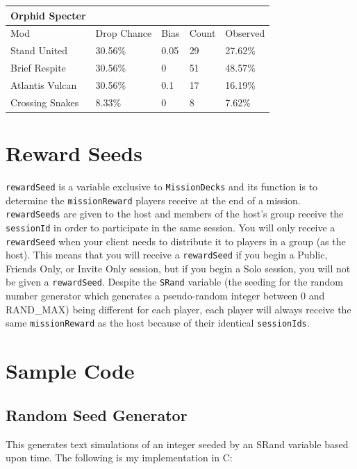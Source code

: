 \documentclass[12pt]{article}
\begin{document}
\begin{center}
	\begin{tabular}{|l||l|l|l||l|}
		\hline
		Orphid Specter \\
		\hline
		Mod             & Drop Chance & Bias & Count & Observed \\
		\hline
		Stand United    & 30.56\%     & 0.05 & 29    & 27.62\%  \\
		Brief Respite   & 30.56\%     & 0    & 51    & 48.57\%  \\
		Atlantis Vulcan & 30.56\%     & 0.1  & 17    & 16.19\%  \\
		Crossing Snakes & 8.33\%      & 0    & 8     & 7.62\%   \\ 
		\hline
	\end{tabular}
\end{center}

\section{Reward Seeds}

\texttt{rewardSeed} is a variable exclusive to \texttt{MissionDecks} and its function is to determine the \texttt{missionReward} players receive at the end of a mission. \texttt{rewardSeeds} are given to the host and members of the host’s group receive the \texttt{sessionId} in order to participate in the same session. You will only receive a \texttt{rewardSeed} when your client needs to distribute it to players in a group (as the host). This means that you will receive a \texttt{rewardSeed} if you begin a Public, Friends Only, or Invite Only session, but if you begin a Solo session, you will not be given a \texttt{rewardSeed}. Despite the \texttt{SRand} variable (the seeding for the random number generator which generates a pseudo-random integer between 0 and RAND\_MAX) being different for each player, each player will always receive the same \texttt{missionReward} as the host because of their identical \texttt{sessionIds}.

\section{Sample Code}

\subsection{Random Seed Generator}

This generates text simulations of an integer seeded by an SRand variable based upon time. The following is my implementation in C:
\end{document}
